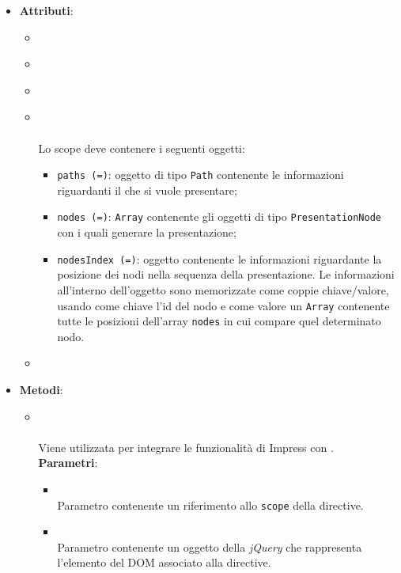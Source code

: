 \begin{itemize}
\begin{itemize}
\end{itemize}
\item \textbf{Attributi}:
\begin{itemize}
\item {}
\\ \dpDirectiveController
\item {}
\\ \dpReplace
\item {}
\\ \dpRestrict
\item {}
\\ \dpIsolatedScope \\
Lo scope deve contenere i seguenti oggetti:
\begin{itemize}
\item \texttt{paths (=)}: oggetto di tipo \texttt{Path} contenente le informazioni riguardanti il  che si vuole presentare;
\item \texttt{nodes (=)}: \texttt{Array} contenente gli oggetti di tipo \texttt{PresentationNode} con i quali generare la presentazione;
\item \texttt{nodesIndex (=)}: oggetto contenente le informazioni riguardante la posizione dei nodi nella sequenza della presentazione. Le informazioni all'interno dell'oggetto sono memorizzate come coppie chiave/valore, usando come chiave l'id del nodo e come valore un \texttt{Array} contenente tutte le posizioni dell'array \texttt{nodes} in cui compare quel determinato nodo.
\end{itemize}
\item {}
\\ \dpTemplateUrl
\end{itemize}
\item \textbf{Metodi}:
\begin{itemize}
\item {}
\\ \dpLinkFn \\ Viene utilizzata per integrare le funzionalità di Impress con .
\\ \textbf{Parametri}:
\begin{itemize}
\item {}
\\ Parametro contenente un riferimento allo \texttt{scope} della directive.
\item {}
\\ Parametro contenente un oggetto della  \textit{jQuery} che rappresenta l'elemento del DOM associato alla directive.
\end{itemize}
\end{itemize}
\end{itemize}
